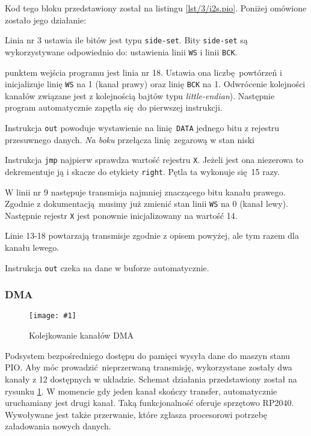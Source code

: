 \documentclass[12pt]{report}
\let\tempone\itemize
\let\temptwo\enditemize
\renewenvironment{itemize}{\tempone\setlength{\itemsep}{0cm}}{\temptwo}
\newcommand{\imgint}[4]{
	\begin{figure}[{#4}]
		\centering
		\texttt{[image: \#1]}
		\caption{#2}
		\label{#1}
	\end{figure}
}
\newcommand{\imgcs}[3]{\imgint{#1}{#2}{#3}{}}
\newcommand{\isqs}{$\text{I}^{2}\text{S}$}
\newcommand{\lstfile}[3]{
	\noindent
	\hspace{0.1\linewidth}
	\begin{minipage}{0.8\linewidth}
		
	\end{minipage}
	\vspace{0.3cm}
}
\begin{document}
				\lstfile{pio}{Kod programu \isqs{}}{lst/3/i2s.pio}
				
				Kod tego bloku przedstawiony został na listingu \ref{lst/3/i2s.pio}. Poniżej omówione zostało jego działanie:
				\begin{itemize}
					\item Linia nr 3 ustawia ile bitów jest typu \lstinline|side-set|. Bity \lstinline|side-set| są wykorzystywane odpowiednio do: ustawienia linii \lstinline|WS| i linii \lstinline|BCK|.
					
					\item punktem wejścia programu jest linia nr 18. Ustawia ona liczbę powtórzeń i inicjalizuje linię \lstinline|WS| na 1 (kanał prawy) oraz linię \lstinline|BCK| na 1. Odwrócenie kolejności kanałów związane jest z kolejnością bajtów typu \textit{little-endian}). Następnie program automatycznie zapętla się do pierwszej instrukcji.
					
					\item Instrukcja \lstinline|out| powoduje wystawienie na linię \lstinline|DATA| jednego bitu z rejestru przesuwnego danych. \textit{Na boku} przełącza linię zegarową w stan niski
					
					\item Instrukcja \lstinline|jmp| najpierw sprawdza wartość rejestru \lstinline|X|. Jeżeli jest ona niezerowa to dekrementuje ją i skacze do etykiety \lstinline|right|. Pętla ta wykonuje się 15 razy.
					
					\item W linii nr 9 następuje transmisja najmniej znaczącego bitu kanału prawego. Zgodnie z dokumentacją musimy już zmienić stan linii \lstinline|WS| na 0 (kanał lewy). Następnie rejestr \lstinline|X| jest ponownie inicjalizowany na wartość 14.
					
					\item Linie 13-18 powtarzają transmisje zgodnie z opisem powyżej, ale tym razem dla kanału lewego.
				\end{itemize}
				
				Instrukcja \lstinline|out| czeka na dane w buforze automatycznie.
			
			\subsubsection{DMA}
				\imgcs{3/dma_chain}{Kolejkowanie kanałów DMA}{0.55}
				Podsystem bezpośredniego dostępu do pamięci wysyła dane do maszyn stanu PIO. Aby móc prowadzić nieprzerwaną transmisję, wykorzystane zostały dwa kanały z 12 dostępnych w układzie. Schemat działania przedstawiony został na rysunku \ref{3/dma_chain}. W momencie gdy jeden kanał skończy transfer, automatycznie uruchamiany jest drugi kanał. Taką funkcjonalność oferuje sprzętowo RP2040. Wywoływane jest także przerwanie, które zgłasza procesorowi potrzebę załadowania nowych danych.
		
\end{document}
